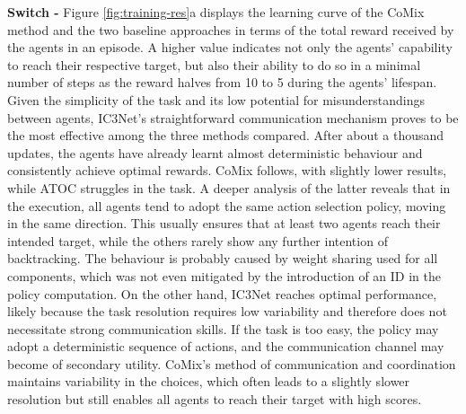 \documentclass[a4paper,singleside,12pt]{report} %
\begin{document}
\textbf{Switch - } Figure \ref{fig:training-res}a displays the learning curve of the CoMix method and the two baseline approaches in terms of the total reward received by the agents in an episode. A higher value indicates not only the agents' capability to reach their respective target, but also their ability to do so in a minimal number of steps as the reward halves from 10 to 5 during the agents' lifespan.\\
Given the simplicity of the task and its low potential for misunderstandings between agents, IC3Net's straightforward communication mechanism proves to be the most effective among the three methods compared. After about a thousand updates, the agents have already learnt almost deterministic behaviour and consistently achieve optimal rewards. CoMix follows, with slightly lower results, while ATOC struggles in the task. A deeper analysis of the latter reveals that in the execution, all agents tend to adopt the same action selection policy, moving in the same direction. This usually ensures that at least two agents reach their intended target, while the others rarely show any further intention of backtracking. The behaviour is probably caused by weight sharing used for all components, which was not even mitigated by the introduction of an ID in the policy computation. On the other hand, IC3Net reaches optimal performance, likely because the task resolution requires low variability and therefore does not necessitate strong communication skills. If the task is too easy, the policy may adopt a deterministic sequence of actions, and the communication channel may become of secondary utility. CoMix's method of communication and coordination maintains variability in the choices, which often leads to a slightly slower resolution but still enables all agents to reach their target with high scores.\\\\
\end{document}
